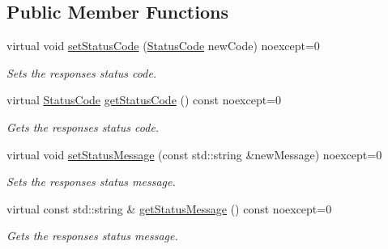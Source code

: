 \subsection*{Public Member Functions}
\begin{DoxyCompactItemize}
\item 
\mbox{\label{structZiApi_1_1HttpResponse_af53d325be33189af4790651b61111818}} 
virtual void \mbox{\hyperlink{structZiApi_1_1HttpResponse_af53d325be33189af4790651b61111818}{set\+Status\+Code}} (\mbox{\hyperlink{structZiApi_1_1HttpResponse_aa304ae6c6c8d12f651eafc75fb203d90}{Status\+Code}} new\+Code) noexcept=0
\begin{DoxyCompactList}\small\item\em Sets the response\textquotesingle{}s status code. \end{DoxyCompactList}\item 
\mbox{\label{structZiApi_1_1HttpResponse_a8d11d9c54e4dc591d6787ac344113800}} 
virtual \mbox{\hyperlink{structZiApi_1_1HttpResponse_aa304ae6c6c8d12f651eafc75fb203d90}{Status\+Code}} \mbox{\hyperlink{structZiApi_1_1HttpResponse_a8d11d9c54e4dc591d6787ac344113800}{get\+Status\+Code}} () const noexcept=0
\begin{DoxyCompactList}\small\item\em Gets the response\textquotesingle{}s status code. \end{DoxyCompactList}\item 
\mbox{\label{structZiApi_1_1HttpResponse_ad119abffde3ba955cc952d04676f5c57}} 
virtual void \mbox{\hyperlink{structZiApi_1_1HttpResponse_ad119abffde3ba955cc952d04676f5c57}{set\+Status\+Message}} (const std\+::string \&new\+Message) noexcept=0
\begin{DoxyCompactList}\small\item\em Sets the response\textquotesingle{}s status message. \end{DoxyCompactList}\item 
\mbox{\label{structZiApi_1_1HttpResponse_a1713f22e0e6d6ea2a4e54b8818a4ab40}} 
virtual const std\+::string \& \mbox{\hyperlink{structZiApi_1_1HttpResponse_a1713f22e0e6d6ea2a4e54b8818a4ab40}{get\+Status\+Message}} () const noexcept=0
\begin{DoxyCompactList}\small\item\em Gets the response\textquotesingle{}s status message. \end{DoxyCompactList}\end{DoxyCompactItemize}
